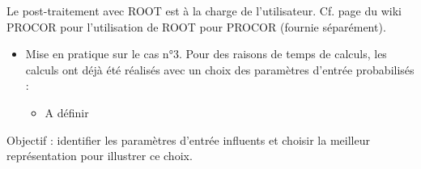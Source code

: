\begin{frame}[fragile]
Le post-traitement avec ROOT est à la charge de l'utilisateur. Cf. page du wiki PROCOR pour l'utilisation de ROOT pour PROCOR (fournie séparément).


\begin{itemize}
    \item Mise en pratique sur le cas n°3. Pour des raisons de temps de calculs, les calculs ont déjà été réalisés avec un choix des paramètres d'entrée probabilisés : 
    
    \begin{itemize}
        \item A définir
    \end{itemize}
\end{itemize}

    \item Objectif : identifier les paramètres d'entrée influents et choisir la meilleur représentation pour illustrer ce choix.



\end{frame}
